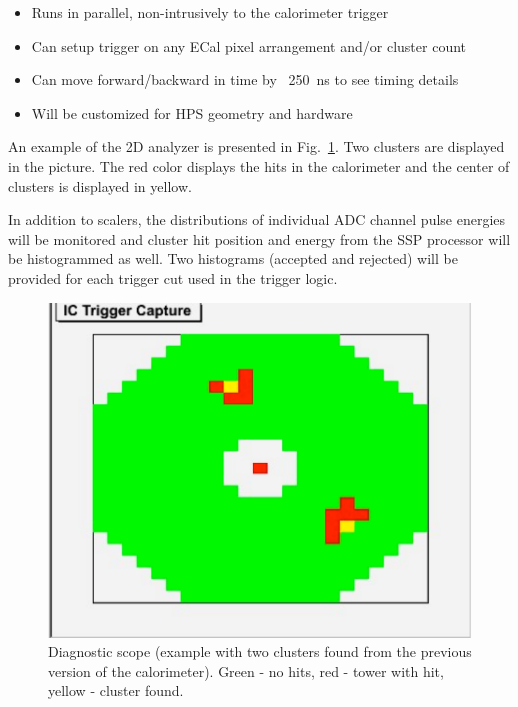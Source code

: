 \begin{itemize}
\item Runs in parallel, non-intrusively to the calorimeter trigger
\item Can setup trigger on any ECal pixel arrangement and/or cluster count
\item Can move forward/backward in time by ~250~ns to see timing details
\item Will be customized for HPS geometry and hardware
\end{itemize}

An example of the 2D analyzer is presented in Fig.~\ref{fig:dvcs_2_cluster}. Two clusters are displayed
in the picture. The red color displays the hits in the calorimeter and  the center of clusters is displayed in yellow.

In addition to scalers, the distributions of individual ADC channel pulse energies will be monitored and  cluster hit position and energy from the SSP processor will be histogrammed as well. Two histograms (accepted and rejected) will be provided for each trigger cut used in the trigger logic.



\begin{figure}[t]
\includegraphics[scale=0.8]{daq_trigger/figures/dvcs_2_cluster}
\caption{\small{Diagnostic scope (example with two clusters found from the previous version of the calorimeter). Green - no hits, red - tower with hit, yellow - cluster found.}}
\label{fig:dvcs_2_cluster}
\end{figure}




